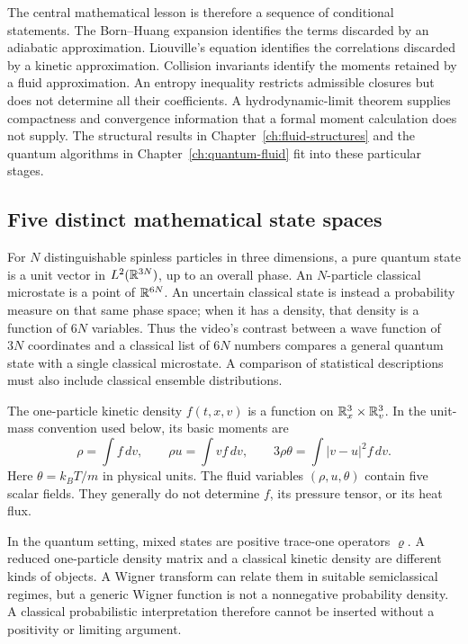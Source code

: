 The central mathematical lesson is therefore a sequence of conditional
statements.  The Born--Huang expansion identifies the terms discarded by an
adiabatic approximation.  Liouville's equation identifies the correlations
discarded by a kinetic approximation.  Collision invariants identify the
moments retained by a fluid approximation.  An entropy inequality restricts
admissible closures but does not determine all their coefficients.  A
hydrodynamic-limit theorem supplies compactness and convergence information
that a formal moment calculation does not supply.  The structural results
in Chapter~\ref{ch:fluid-structures} and the quantum algorithms in
Chapter~\ref{ch:quantum-fluid} fit into these particular stages.

\subsection{Five distinct mathematical state spaces}

For $N$ distinguishable spinless particles in three dimensions, a pure
quantum state is a unit vector in $L^2(\mathbb{R}^{3N})$, up to an overall phase.
An $N$-particle classical microstate is a point of $\mathbb{R}^{6N}$.  An uncertain
classical state is instead a probability measure on that same phase space;
when it has a density, that density is a function of $6N$ variables.  Thus
the video's contrast between a wave function of $3N$ coordinates and a
classical list of $6N$ numbers compares a general quantum state with a
single classical microstate.  A comparison of statistical descriptions must
also include classical ensemble distributions.

The one-particle kinetic density $f(t,x,v)$ is a function on
$\mathbb{R}^3_x\times\mathbb{R}^3_v$.  In the unit-mass convention used below, its basic
moments are
\begin{equation}
 \rho=\int f\,dv,\qquad
 \rho u=\int vf\,dv,\qquad
 3\rho\theta=\int |v-u|^2f\,dv.
 \label{eq:micro-basic-moments}
\end{equation}
Here $\theta=k_BT/m$ in physical units.  The fluid variables
$(\rho,u,\theta)$ contain five scalar fields.  They generally do not
determine $f$, its pressure tensor, or its heat flux.

In the quantum setting, mixed states are positive trace-one operators
$\varrho$.  A reduced one-particle density matrix and a classical kinetic
density are different kinds of objects.  A Wigner transform can relate
them in suitable semiclassical regimes, but a generic Wigner function is
not a nonnegative probability density.  A classical probabilistic
interpretation therefore cannot be inserted without a positivity or
limiting argument.


